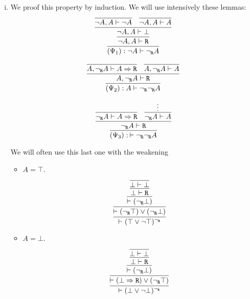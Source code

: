 \begin{enumerate}[(i)]
    \item We proof this property by induction.
    We will use intensively these lemmas:
    $$
    \infer{
        (\Psi_1) : \neg A \vdash \ngr A
    }{
        \infer{
            \neg A, A \vdash \R
        }{
            \infer{
                \neg A, A \vdash \bot
            }{
                \infer{
                    \neg A, A \vdash \neg A
                }{
                }&
                \infer{
                    \neg A, A \vdash A
                }{
                }
            }
        }
    }
    $$
    
    $$
    \infer{
        (\Psi_2) : A \vdash \ngr \ngr A
    }{
        \infer{
            A, \ngr A \vdash \R
        }{
            \infer{
                A, \ngr A \vdash A\Rightarrow \R
            }{
            }&
            \infer{
                A, \ngr A \vdash A
            }{
            }
        }
    }
    $$
    
    $$
    \infer{
        (\Psi_3) :\: \vdash \ngr \ngr A
    }{
        \infer{
             \ngr A \vdash \R
        }{
            \infer{
                 \ngr A \vdash A\Rightarrow \R
            }{
            }&
            \infer{
            \ngr A \vdash A
            }{
                \vdots
            }
        }
    }
    $$
    
    We will often use this last one with the weakening
    
    \begin{itemize}
        \item $A = \top$.
            $$
            \infer{
                \vdash (\top \vee \neg \top)^\ngr
            }{
                \infer{
                    \vdash (\ngr \top) \vee (\ngr \bot)
                }{
                    \infer{
                        \vdash (\ngr \bot)
                    }{
                        \infer{
                            \bot \vdash \R
                        }{
                            \infer{
                                \bot \vdash \bot
                            }{
                            }
                        }
                    }
                }
            }
            $$
        \item $A = \bot$.
            $$
            \infer{
                \vdash (\bot \vee \neg \bot)^\ngr
            }{
                \infer{
                    \vdash (\bot \Rightarrow \R) \vee (\ngr \top)
                }{
                    \infer{
                        \vdash (\ngr \bot)
                    }{
                        \infer{
                            \bot \vdash \R
                        }{
                            \infer{\bot \vdash \bot}{}
                        }
                    }
                }
            }
            $$


\end{itemize}
\end{enumerate}
